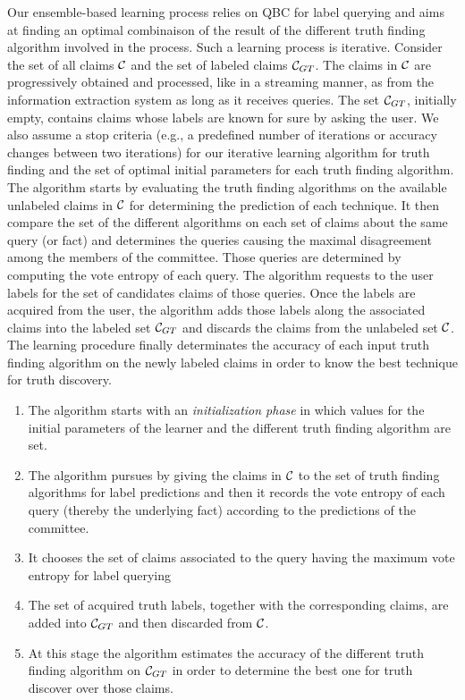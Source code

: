 Our ensemble-based learning process relies on QBC for label querying and aims at finding an optimal combinaison of the result
of the different truth finding algorithm involved in the process. Such a learning process is iterative. Consider the set of 
all claims $\mathcal{C}{}$ and the set of labeled claims $\mathcal{C}_{GT}$. The claims in $\mathcal{C}{}$ are progressively obtained
and processed, like in a streaming manner, as from the information extraction system as long as it receives queries.
The set $\mathcal{C}_{GT}$, initially empty, contains
claims whose labels are known for sure by asking the user. We also assume a stop criteria (e.g., a predefined number of iterations 
or accuracy changes between two iterations) for our iterative learning algorithm for truth finding and the set of optimal initial
parameters for each truth finding algorithm.
The algorithm starts by evaluating the truth finding algorithms on the available unlabeled claims in $\mathcal{C}{}$ for determining
the prediction of each technique. It then compare the set of the different algorithms on each set of claims about the same query (or fact)
and determines the queries causing the maximal disagreement among the members of the committee. Those queries are determined by computing 
the vote entropy of each query. The algorithm requests to the user labels for the set of candidates claims of those queries. Once the labels
are acquired from the user, the algorithm adds those labels along the associated claims into the labeled set $\mathcal{C}_{GT}$ and discards the
claims from the unlabeled set $\mathcal{C}{}$. The learning procedure finally determinates the accuracy of each input truth finding algorithm on
the newly labeled claims in order to know the best technique for truth discovery. 

\begin{enumerate}
\item The algorithm starts with an \emph{initialization phase} in which values for the initial parameters of the learner and the different truth 
finding algorithm are set.
 \item The algorithm pursues by giving the claims in $\mathcal{C}{}$ to the set of truth finding algorithms for label predictions and then 
 it records the vote entropy of each query (thereby the underlying fact) according to the predictions of the committee.
 \item It chooses the set of claims associated to the query having the maximum vote entropy for label querying
 \item The set of acquired truth labels, together with the corresponding claims, are added into  $\mathcal{C}_{GT}$ and then discarded from $\mathcal{C}{}$.
 \item At this stage the algorithm estimates the accuracy of the different truth finding algorithm on  $\mathcal{C}_{GT}$ in order to determine the best one
 for truth discover over those claims.
\end{enumerate}

